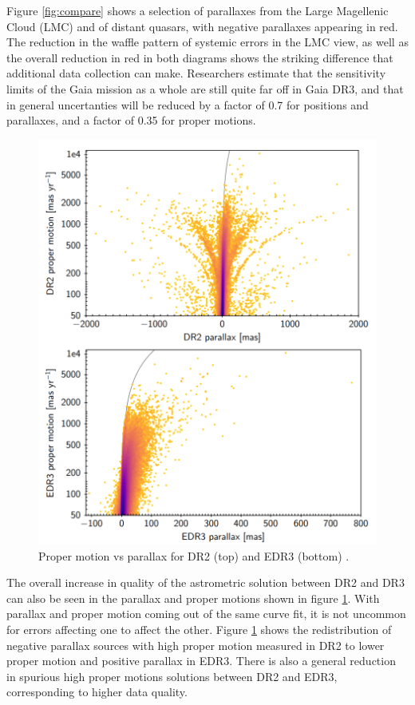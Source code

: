 \documentclass[twocolumn]{aastex631}
\begin{document}
Figure \ref{fig:compare} shows a selection of parallaxes from the Large Magellenic Cloud (LMC) and of distant quasars, with negative parallaxes appearing in red. The reduction in the waffle pattern of systemic errors in the LMC view, as well as the overall reduction in red in both diagrams shows the striking difference that additional data collection can make. Researchers estimate that the sensitivity limits of the Gaia mission as a whole are still quite far off in Gaia DR3, and that in general uncertanties will be reduced by a factor of 0.7 for positions and parallaxes, and a factor of 0.35 for proper motions\citep{lindegrenGaia2021a}. 
\begin{figure}
	\includegraphics[width=\columnwidth]{parallaxvspropermotiondr2edr3crop.png}
	\caption{Proper motion vs parallax for DR2 (top) and EDR3 (bottom) \cite{fabriciusGaia2021}.}
	\label{fig:comparepm}
\end{figure}

The overall increase in quality of the astrometric solution between DR2 and DR3 can also be seen in the parallax and proper motions shown in figure \ref{fig:comparepm}. With parallax and proper motion coming out of the same curve fit, it is not uncommon for errors affecting one to affect the other. Figure \ref{fig:comparepm} shows the redistribution of negative parallax sources with high proper motion measured in DR2 to lower proper motion and positive parallax in EDR3. There is also a general reduction in spurious high proper motions solutions between DR2 and EDR3, corresponding to higher data quality.
\end{document}
